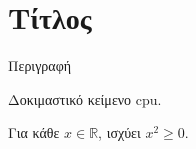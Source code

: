 \section{Τίτλος}


\begin{theorem}
Περιγραφή
\end{theorem}

\par Δοκιμαστικό κείμενο \gls{cpu}.


\begin{lemma}
Για κάθε $x\in\mathbb{R}$, ισχύει $x^2\geq 0$.
\end{lemma}